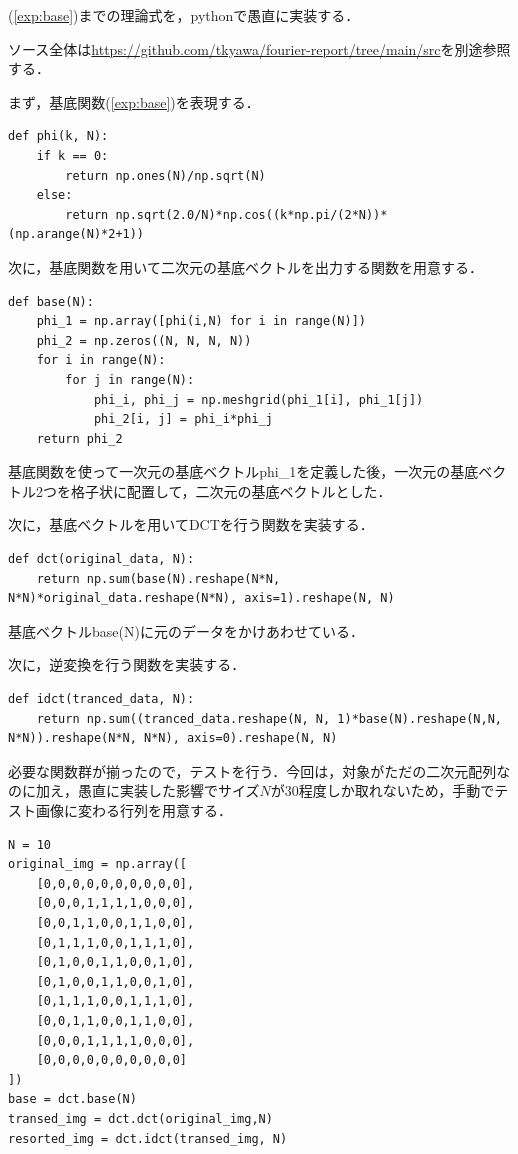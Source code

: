 \documentclass[uplatex,dvipdfmx,ja=standard]{bxjsarticle}
\begin{document}
(\ref{exp:base})までの理論式を，pythonで愚直に実装する．

ソース全体は\url{https://github.com/tkyawa/fourier-report/tree/main/src}を別途参照する．

まず，基底関数(\ref{exp:base})を表現する．

\begin{lstlisting}[caption=dct.phi]
def phi(k, N):
    if k == 0:
        return np.ones(N)/np.sqrt(N)
    else:
        return np.sqrt(2.0/N)*np.cos((k*np.pi/(2*N))*(np.arange(N)*2+1))
\end{lstlisting}

次に，基底関数を用いて二次元の基底ベクトルを出力する関数を用意する．
\newpage

\begin{lstlisting}[caption=dct.base]
def base(N):
    phi_1 = np.array([phi(i,N) for i in range(N)])
    phi_2 = np.zeros((N, N, N, N))
    for i in range(N):
        for j in range(N):
            phi_i, phi_j = np.meshgrid(phi_1[i], phi_1[j])
            phi_2[i, j] = phi_i*phi_j
    return phi_2
\end{lstlisting}


基底関数を使って一次元の基底ベクトルphi\_1を定義した後，一次元の基底ベクトル2つを格子状に配置して，二次元の基底ベクトルとした．

次に，基底ベクトルを用いてDCTを行う関数を実装する．

\begin{lstlisting}[caption=dct.dct]
def dct(original_data, N):
    return np.sum(base(N).reshape(N*N, N*N)*original_data.reshape(N*N), axis=1).reshape(N, N)
\end{lstlisting}

基底ベクトルbase(N)に元のデータをかけあわせている．

次に，逆変換を行う関数を実装する．

\begin{lstlisting}[caption=dct.idct]
def idct(tranced_data, N):
    return np.sum((tranced_data.reshape(N, N, 1)*base(N).reshape(N,N, N*N)).reshape(N*N, N*N), axis=0).reshape(N, N)
\end{lstlisting}


必要な関数群が揃ったので，テストを行う．今回は，対象がただの二次元配列なのに加え，愚直に実装した影響でサイズ$N$が30程度しか取れないため，手動でテスト画像に変わる行列を用意する．

\begin{lstlisting}[caption=main.py]
N = 10
original_img = np.array([
	[0,0,0,0,0,0,0,0,0,0],
	[0,0,0,1,1,1,1,0,0,0],
	[0,0,1,1,0,0,1,1,0,0],
	[0,1,1,1,0,0,1,1,1,0],
	[0,1,0,0,1,1,0,0,1,0],
	[0,1,0,0,1,1,0,0,1,0],
	[0,1,1,1,0,0,1,1,1,0],
	[0,0,1,1,0,0,1,1,0,0],
	[0,0,0,1,1,1,1,0,0,0],
	[0,0,0,0,0,0,0,0,0,0]
])
base = dct.base(N)
transed_img = dct.dct(original_img,N)
resorted_img = dct.idct(transed_img, N)
\end{lstlisting}
\end{document}
